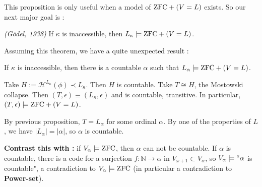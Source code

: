 \documentclass[12pt,a4paper]{article}
\newenvironment{proof}
{\begin{changemargin}{0.5cm}{0.5cm} 
	}%
	{\end{changemargin}
}
\newenvironment{p}
{\begin{proof} 
	}%
	{\end{proof}
}
\begin{document}
This proposition is only useful when a model of $\text{ZFC} + (V=L)$ exists. So our next major goal is :
\s

\thm \emph{(G\"odel, 1938)} If $\kappa$ is inaccessible, then $L_{\kappa}\models \text{ZFC}+ (V=L)$. 
\s

Assuming this theorem, we have a quite unexpected result :
\s

\corr If $\kappa$ is inaccessible, then there is a countable $\alpha$ such that $L_{\alpha} \models\text{ZFC} + (V=L)$.
\begin{p}
\pf Take $H:= \mathcal{H}^{L_{\kappa}}(\phi) \prec L_{\kappa}$. Then $H$ is countable. Take $T\cong H$, the Mostowski collapse. Then $(T, \epsilon) \equiv (L_{\kappa}, \epsilon)$ and is countable, transitive. In particular, $(T, \epsilon) \models \text{ZFC} + (V=L)$.

\quad By previous proposition, $T= L_{\alpha}$ for some ordinal $\alpha$. By one of the properties of $L$, we have $|L_{\alpha}| = |\alpha|$, so $\alpha$ is countable.

\eop 
\end{p}
\s

\textbf{Contrast this with :} if $V_{\alpha} \models \text{ZFC}$, then $\alpha$ can not be countable. If $\alpha$ is countable, there is a code for a surjection $f: \mathbb{N} \rightarrow \alpha$ in $V_{\omega+1} \subset V_{\alpha}$, so $V_{\alpha}\models ``\alpha$ is countable", a contradiction to $V_{\alpha} \models \text{ZFC}$ (in particular a contradiction to \textbf{Power-set}). 
\s
\end{document}
